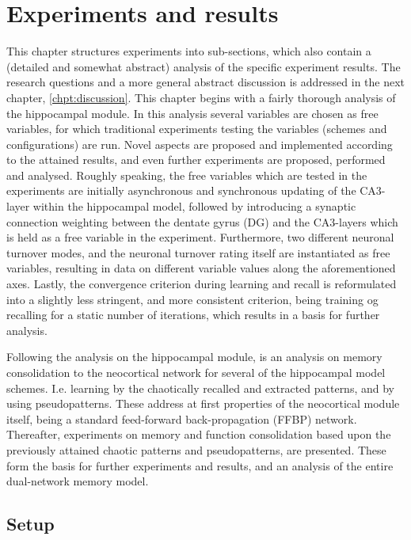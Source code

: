 
\chapter{Experiments and results}\label{chpt:experiments}

This chapter structures experiments into sub-sections, which also contain a (detailed and somewhat abstract) analysis of the specific experiment results. The research questions and a more general abstract discussion is addressed in the next chapter, \ref{chpt:discussion}.
This chapter begins with a fairly thorough analysis of the hippocampal module. In this analysis several variables are chosen as free variables, for which traditional experiments testing the variables (schemes and configurations) are run. Novel aspects are proposed and implemented according to the attained results, and even further experiments are proposed, performed and analysed.
Roughly speaking, the free variables which are tested in the experiments are initially asynchronous and synchronous updating of the CA3-layer within the hippocampal model, followed by introducing a synaptic connection weighting between the dentate gyrus (DG) and the CA3-layers which is held as a free variable in the experiment. Furthermore, two different neuronal turnover modes, and the neuronal turnover rating itself are instantiated as free variables, resulting in data on different variable values along the aforementioned axes. Lastly, the convergence criterion during learning and recall is reformulated into a slightly less stringent, and more consistent criterion, being training og recalling for a static number of iterations, which results in a basis for further analysis.

Following the analysis on the hippocampal module, is an analysis on memory consolidation to the neocortical network for several of the hippocampal model schemes. I.e. learning by the chaotically recalled and extracted patterns, and by using pseudopatterns.
These address at first properties of the neocortical module itself, being a standard feed-forward back-propagation (FFBP) network. Thereafter, experiments on memory and function consolidation based upon the previously attained chaotic patterns and pseudopatterns, are presented. These form the basis for further experiments and results, and an analysis of the entire dual-network memory model.


\section{Setup}

